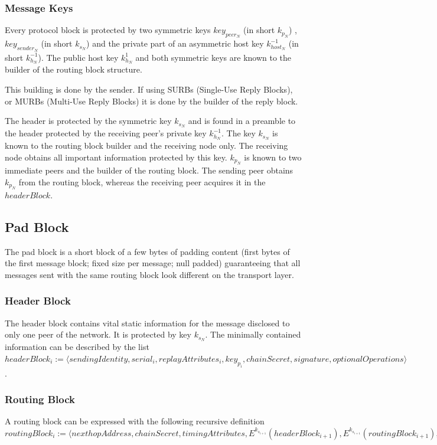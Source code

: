 \documentclass[runningheads]{llncs}
\begin{document}
\subsubsection{Message Keys}
Every protocol block is protected by two symmetric keys $key_{peer_N}$ (in short $k_{p_N}$) , $key_{sender_N}$ (in short $k_{s_N}$) and the private part of an asymmetric host key $k^{-1}_{host_N}$ (in short $k^{-1}_{h_N}$). The public host key $k^{1}_{h_N}$ and both symmetric keys are known to the builder of the routing block structure. 

This building is done by the sender. If using SURBs (Single-Use Reply Blocks), or MURBs (Multi-Use Reply Blocks) it is done by the builder of the reply block. 

The header is protected by the symmetric key $k_{s_N}$ and is found in a preamble to the header protected by the receiving peer's private key $k^{-1}_{h_N}$. The key $k_{s_N}$ is known to the routing block builder and the receiving node only. The receiving node obtains all important information protected by this key. $k_{p_N}$ is known to two immediate peers and the builder of the routing block. The sending peer obtains $k_{p_N}$ from the routing block, whereas the receiving peer acquires it in the $headerBlock$. 

\subsection{Pad Block}
The pad block is a short block of a few bytes of padding content (first bytes of the first message block; fixed size per message; null padded) guaranteeing that all messages sent with the same routing block look different on the transport layer.

\subsubsection{Header Block}
The header block contains vital static information for the message disclosed to only one peer of the network. It is protected by key $k_{s_N}$. The minimally contained information can be described by the list $headerBlock_i:=\langle sendingIdentity,\allowbreak{} serial_i,\allowbreak{} replayAttributes_i,\allowbreak{} key_{p_i},\allowbreak{} chainSecret,\allowbreak{} signature,\allowbreak{} optionalOperations \rangle$.

\subsubsection{Routing Block}
A routing block can be expressed with the following recursive definition $routingBlock_i:=\langle\allowbreak{} nexthopAddress,\allowbreak{} chainSecret,\allowbreak{} timingAttributes,\allowbreak{} E^{k_{s_{i+1}}}\left(headerBlock_{i+1}\right),\allowbreak{} E^{k_{s_{i+1}}}\left(routingBlock_{i+1}\right),\allowbreak{} payloadBuildInstructions_i,\allowbreak{} payloadId,\allowbreak{} optionalReplyBlocks \rangle$
\end{document}
